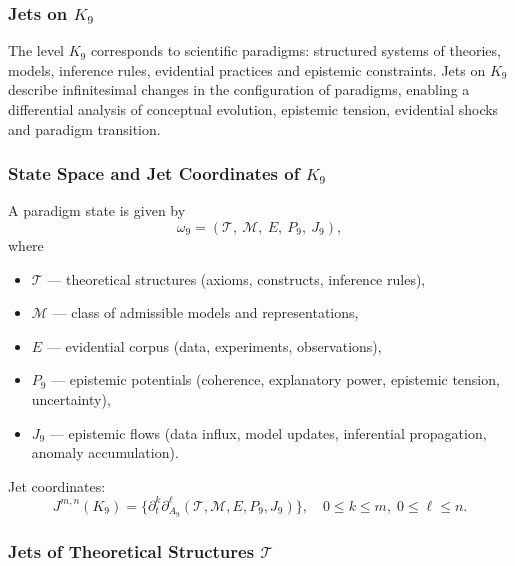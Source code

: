 
\subsubsection{Jets on \texorpdfstring{$K_9$}{K_9}}
\label{sec:jets-k9}

The level $K_9$ corresponds to scientific paradigms: structured systems
of theories, models, inference rules, evidential practices and epistemic
constraints. Jets on $K_9$ describe infinitesimal changes in the
configuration of paradigms, enabling a differential analysis of
conceptual evolution, epistemic tension, evidential shocks and paradigm
transition.


\subsubsection{State Space and Jet Coordinates of \texorpdfstring{$K_9$}{K_9}}

A paradigm state is given by
\[
\omega_9 =
(\mathcal{T},\ \mathcal{M},\ E,\ P_9,\ J_9),
\]
where
\begin{itemize}
    \item $\mathcal{T}$ — theoretical structures (axioms, constructs,
          inference rules),
    \item $\mathcal{M}$ — class of admissible models and representations,
    \item $E$ — evidential corpus (data, experiments, observations),
    \item $P_9$ — epistemic potentials (coherence, explanatory power,
          epistemic tension, uncertainty),
    \item $J_9$ — epistemic flows (data influx, model updates,
          inferential propagation, anomaly accumulation).
\end{itemize}

Jet coordinates:
\[
J^{m,n}(K_9)
=
\{\partial_t^k \partial_{A_9}^\ell
(\mathcal{T},\mathcal{M},E,P_9,J_9)
\},
\quad
0\le k\le m,\;
0\le\ell\le n.
\]


\subsubsection{Jets of Theoretical Structures $\mathcal{T}$}

